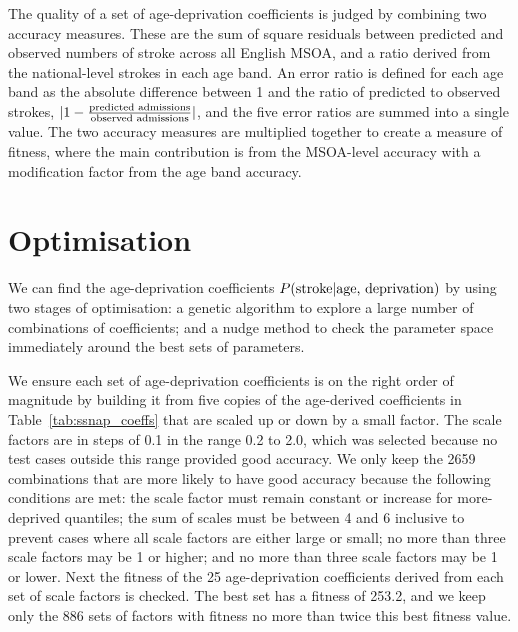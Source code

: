 \documentclass[12pt]{extarticle}
\begin{document}
The quality of a set of age-deprivation coefficients is judged by combining two accuracy measures. 
These are the sum of square residuals between predicted and observed numbers of stroke across all English MSOA, and
a ratio derived from the national-level strokes in each age band.
An error ratio is defined for each age band as the absolute difference between 1 and the ratio of predicted to observed strokes, 
$|1 - \frac{\textnormal{predicted admissions}}{\textnormal{observed admissions}} |$,
and the five error ratios are summed into a single value.
The two accuracy measures are multiplied together to create a measure of fitness, where the main contribution is from the MSOA-level accuracy with a modification factor from the age band accuracy.


\section{Optimisation}
We can find the age-deprivation coefficients $P(\textnormal{stroke} | \textnormal{age, deprivation})$ by using two stages of optimisation:
a genetic algorithm to explore a large number of combinations of coefficients;
and a nudge method to check the parameter space immediately around the best sets of parameters.

We ensure each set of age-deprivation coefficients is on the right order of magnitude by building it from five copies of the age-derived coefficients in Table~\ref{tab:ssnap_coeffs} that are scaled up or down by a small factor.
The scale factors are in steps of 0.1 in the range 0.2 to 2.0, which was selected because no test cases outside this range provided good accuracy.
% 
We only keep the 2659 combinations that are more likely to have good accuracy because the following conditions are met:
the scale factor must remain constant or increase for more-deprived quantiles;
the sum of scales must be between 4 and 6 inclusive to prevent cases where all scale factors are either large or small;
no more than three scale factors may be 1 or higher;
and no more than three scale factors may be 1 or lower. 
Next the fitness of the 25 age-deprivation coefficients derived from each set of scale factors is checked.
The best set has a fitness of 253.2, and we keep only the 886 sets of factors with fitness no more than twice this best fitness value.
\end{document}
